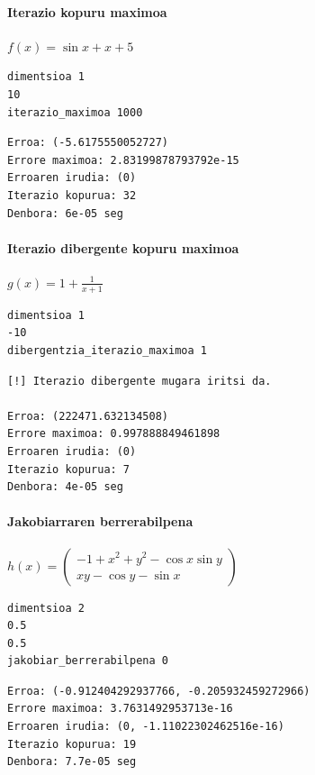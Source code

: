 \documentclass[10pt,a4paper,basque]{article}
\begin{document}
\paragraph{Iterazio kopuru maximoa}

$f(x) = \sin{x} + x + 5$

\begin{lstlisting}
dimentsioa 1
10
iterazio_maximoa 1000
\end{lstlisting}

\begin{lstlisting}
Erroa: (-5.6175550052727)
Errore maximoa: 2.83199878793792e-15
Erroaren irudia: (0)
Iterazio kopurua: 32
Denbora: 6e-05 seg
\end{lstlisting}

\paragraph{Iterazio dibergente kopuru maximoa}

$g(x) = 1 + \frac{1}{x + 1}$

\begin{lstlisting}
dimentsioa 1
-10
dibergentzia_iterazio_maximoa 1
\end{lstlisting}

\begin{lstlisting}
[!] Iterazio dibergente mugara iritsi da.

Erroa: (222471.632134508)
Errore maximoa: 0.997888849461898
Erroaren irudia: (0)
Iterazio kopurua: 7
Denbora: 4e-05 seg
\end{lstlisting}

\paragraph{Jakobiarraren berrerabilpena}

$h(x) = \left(
\begin{array}{c}
-1 + x^2 + y^2 - \cos{x}\sin{y}\\
xy - \cos{y} - \sin{x}
\end{array}
\right)$

\begin{lstlisting}
dimentsioa 2
0.5
0.5
jakobiar_berrerabilpena 0
\end{lstlisting}

\begin{lstlisting}
Erroa: (-0.912404292937766, -0.205932459272966)
Errore maximoa: 3.7631492953713e-16
Erroaren irudia: (0, -1.11022302462516e-16)
Iterazio kopurua: 19
Denbora: 7.7e-05 seg
\end{lstlisting}
\end{document}
